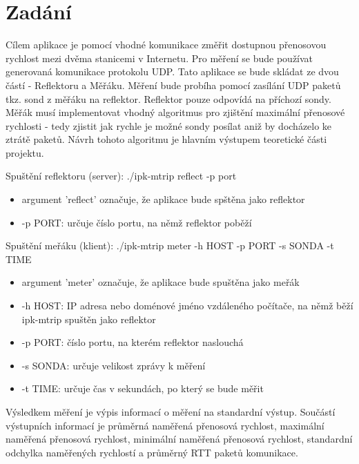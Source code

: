 \documentclass[11pt]{article}
\begin{document}
	\section{Zadání}
	\begin{flushleft}
		Cílem aplikace je pomocí vhodné komunikace změřit dostupnou přenosovou rychlost mezi dvěma stanicemi v Internetu. Pro měření se bude používat generovaná komunikace protokolu UDP. Tato aplikace se bude skládat ze dvou částí - Reflektoru a Měřáku. Měření bude probíha pomocí zasílání UDP paketů tkz. sond z měřáku na reflektor. Reflektor pouze odpovídá na příchozí sondy. Měřák musí implementovat vhodný algoritmus pro zjištění maximální přenosové rychlosti - tedy zjistit jak rychle je možné sondy posílat aniž by docházelo ke ztrátě paketů. Návrh tohoto algoritmu je hlavním výstupem teoretické části projektu.\par		
		
		\begin{center}
			Spuštění reflektoru (server): ./ipk-mtrip reflect -p port\\[0.5 cm]
			\begin{itemize}
				\item argument 'reflect' označuje, že aplikace bude spštěna jako reflektor
				\item -p PORT: určuje číslo portu, na němž reflektor poběží
			\end{itemize}
		\end{center}
		\begin{center}
			Spuštění meřáku (klient): ./ipk-mtrip meter -h HOST -p PORT -s SONDA -t TIME  \\[0.5 cm]
			\begin{itemize}
				\item argument 'meter' označuje, že aplikace bude spuštěna jako meřák
				\item -h HOST: IP adresa nebo doménové jméno vzdáleného počítače, na němž běží ipk-mtrip spuštěn jako reflektor
				\item -p PORT: číslo portu, na kterém reflektor naslouchá
				\item -s SONDA: určuje velikost zprávy k měření
				\item -t TIME: určuje čas v sekundách, po který se bude měřit
			\end{itemize}
		\end{center}
		
		Výsledkem měření je výpis informací o měření na standardní výstup. Součástí výstupních informací je průměrná naměřená přenosová rychlost, maximální naměřená přenosová rychlost, minimální naměřená přenosová rychlost, standardní odchylka naměřených rychlostí a průměrný RTT paketů komunikace.
			
	\end{flushleft}
	
\end{document}
